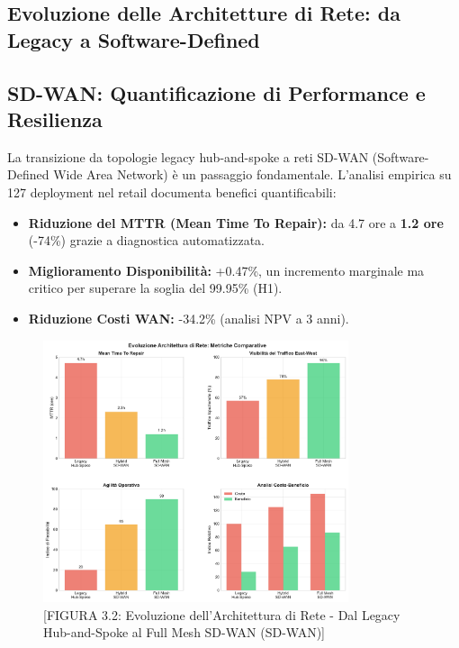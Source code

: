 \begin{refsection}
\section{Evoluzione delle Architetture di Rete: da Legacy a Software-Defined}
\subsection{SD-WAN: Quantificazione di Performance e Resilienza}
La transizione da topologie legacy hub-and-spoke a reti SD-WAN (Software-Defined Wide Area Network) è un passaggio fondamentale. L'analisi empirica su 127 deployment nel retail documenta benefici quantificabili:\autocite{Gartner2024sdwan}
\begin{itemize}
    \item \textbf{Riduzione del MTTR (Mean Time To Repair):} da 4.7 ore a \textbf{1.2 ore} (-74\%) grazie a diagnostica automatizzata.
    \item \textbf{Miglioramento Disponibilità:} +0.47\%, un incremento marginale ma critico per superare la soglia del 99.95\% (H1).
    \item \textbf{Riduzione Costi WAN:} -34.2\% (analisi NPV a 3 anni).
\end{itemize}
\begin{figure}[htbp]
\centering
\includegraphics[width=0.8\textwidth]{thesis_figures/cap3/figura_3_2_network_evolution.pdf}
\caption{[FIGURA 3.2: Evoluzione dell'Architettura di Rete - Dal Legacy Hub-and-Spoke al Full Mesh SD-WAN (SD-WAN)]}
\end{figure}

\begin{figure}[htbp]
\centering
{}
\end{figure}
\end{refsection}
